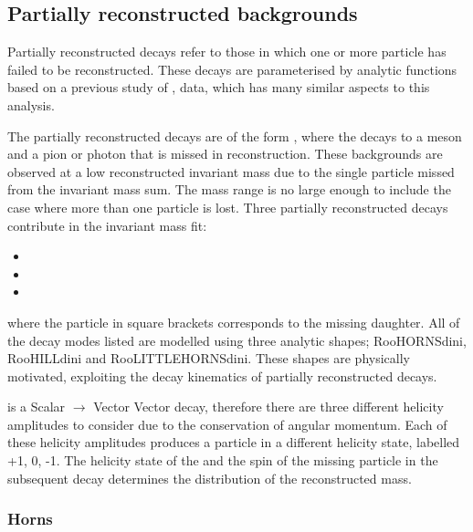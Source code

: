\subsection{Partially reconstructed backgrounds}
\label{sec:massfit:partreco}

Partially reconstructed decays refer to those in which one or more particle has failed to be reconstructed. These decays are parameterised by analytic functions based on a previous study of \decay{\Bm}{\D\Km},  data, which has many similar aspects to this analysis.

The partially reconstructed decays are of the form \decay{\B}{\Dstar\Kstar}, where the \Dstar decays to a \D meson and a pion or photon that is missed in reconstruction. These backgrounds are observed at a low reconstructed invariant mass due to the single particle missed from the invariant mass sum. The \B mass range is no large enough to include the case where more than one particle is lost. Three partially reconstructed decays contribute in the invariant mass fit:

\begin{itemize}
\item{\decay{\Bm}{(\decay{\Dstarz}{\Dz[\piz]})\Kstarm}}
\item{\decay{\Bm}{(\decay{\Dstarz}{\Dz[\gamma]})\Kstarm}}
\item{\decay{\Bd}{(\decay{\Dstarp}{\Dz[\pip]})\Kstarm}}
\end{itemize}

where the particle in square brackets corresponds to the missing daughter. All of the decay modes listed are modelled using three analytic shapes; RooHORNSdini, RooHILLdini and RooLITTLEHORNSdini. These shapes are physically motivated, exploiting the decay kinematics of partially reconstructed decays.

\decay{\B}{\Dstar\Kstar} is a Scalar $\to$ Vector Vector decay, therefore there are three different helicity amplitudes to consider due to the conservation of angular momentum. Each of these helicity amplitudes produces a \Dstar particle in a different helicity state, labelled +1, 0, -1. The helicity state of the \Dstar and the spin of the missing particle in the subsequent \Dstar decay determines the distribution of the reconstructed \B mass. 

\subsubsection{Horns}

